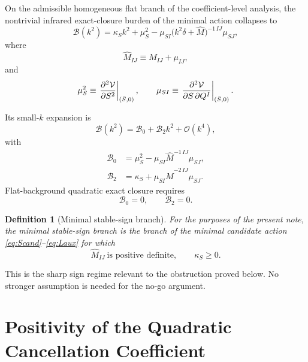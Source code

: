 \documentclass[11pt]{article}
\newtheorem{definition}{Definition}
\begin{document}
On the admissible homogeneous flat branch of the coefficient-level analysis, the nontrivial infrared exact-closure burden of the minimal action collapses to
\begin{equation}
\mathcal B(k^2)
=
\kappa_Sk^2
+\mu_S^2
-\mu_{SI}\bigl(k^2\delta+\widehat M\bigr)^{-1\,IJ}\mu_{SJ},
\label{eq:Bk}
\end{equation}
where
\begin{equation}
\widehat M_{IJ}\equiv M_{IJ}+\mu_{IJ},
\label{eq:Mhat}
\end{equation}
and
\begin{equation}
\mu_S^2\equiv \eval{\pdv[2]{\mathcal V}{S}}_{(\bar S,0)},
\qquad
\mu_{SI}\equiv \eval{\frac{\partial^2\mathcal V}{\partial S\,\partial Q^I}}_{(\bar S,0)}.
\label{eq:mudefs}
\end{equation}

Its small-\(k\) expansion is
\begin{equation}
\mathcal B(k^2)=\mathcal B_0+\mathcal B_2k^2+\mathcal O(k^4),
\label{eq:Bexpand}
\end{equation}
with
\begin{align}
\mathcal B_0
&=
\mu_S^2-\mu_{SI}\widehat M^{-1\,IJ}\mu_{SJ},
\label{eq:B0}
\\
\mathcal B_2
&=
\kappa_S+\mu_{SI}\widehat M^{-2\,IJ}\mu_{SJ}.
\label{eq:B2}
\end{align}
Flat-background quadratic exact closure requires
\begin{equation}
\mathcal B_0=0,
\qquad
\mathcal B_2=0.
\label{eq:Bconditions}
\end{equation}

\begin{definition}[Minimal stable-sign branch]
For the purposes of the present note, the minimal stable-sign branch is the branch of the minimal candidate action \eqref{eq:Scand}--\eqref{eq:Laux} for which
\begin{equation}
\widehat M_{IJ}\ \text{is positive definite},
\qquad
\kappa_S\ge 0.
\label{eq:stablesign}
\end{equation}
\end{definition}

This is the sharp sign regime relevant to the obstruction proved below. No stronger assumption is needed for the no-go argument.

\section{Positivity of the Quadratic Cancellation Coefficient}
\end{document}
